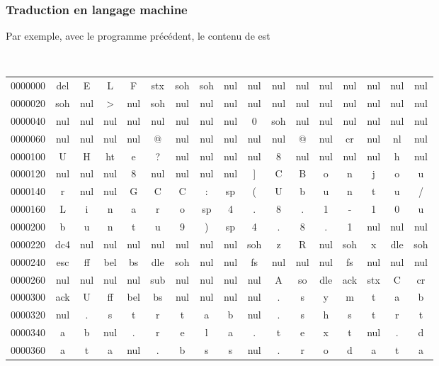 \begin{frame}[fragile]
\frametitle{Traduction en langage machine}
Par exemple, avec le programme précédent, le contenu de 
est
\medskip

{\tt \footnotesize
\setlength{\tabcolsep}{.07cm}
\begin{tabular}{ccccccccccccccccc}
0000000 &del &E &L &F &stx &soh &soh &nul &nul &nul &nul &nul &nul &nul &nul &nul \\
0000020 &soh &nul &> &nul &soh &nul &nul &nul &nul &nul &nul &nul &nul &nul &nul &nul \\
0000040 &nul &nul &nul &nul &nul &nul &nul &nul &0 &soh &nul &nul &nul &nul &nul &nul \\
0000060 &nul &nul &nul &nul &@ &nul &nul &nul &nul &nul &@ &nul &cr &nul &nl &nul \\
0000100 &U &H &ht &e &? &nul &nul &nul &nul &8 &nul &nul &nul &nul &h &nul \\
0000120 &nul &nul &nul &8 &nul &nul &nul &nul &] &C &B &o &n &j &o &u \\
0000140 &r &nul &nul &G &C &C &: &sp &( &U &b &u &n &t &u &/ \\
0000160 &L &i &n &a &r &o &sp &4 &. &8 &. &1 &- &1 &0 &u \\
0000200 &b &u &n &t &u &9 &) &sp &4 &. &8 &. &1 &nul &nul &nul \\
0000220 &dc4 &nul &nul &nul &nul &nul &nul &nul &soh &z &R &nul &soh &x &dle &soh \\
0000240 &esc &ff &bel &bs &dle &soh &nul &nul &fs &nul &nul &nul &fs &nul &nul &nul \\
0000260 &nul &nul &nul &nul &sub &nul &nul &nul &nul &A &so &dle &ack &stx &C &cr \\
0000300 &ack &U &ff &bel &bs &nul &nul &nul &nul &. &s &y &m &t &a &b \\
0000320 &nul &. &s &t &r &t &a &b &nul &. &s &h &s &t &r &t \\
0000340 &a &b &nul &. &r &e &l &a &. &t &e &x &t &nul &. &d \\
0000360 &a &t &a &nul &. &b &s &s &nul &. &r &o &d &a &t &a \\
\end{tabular}}
\end{frame}

